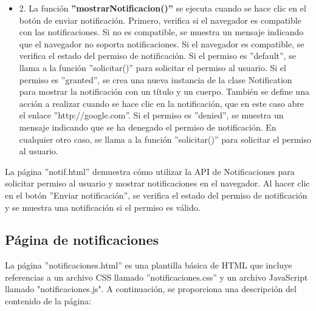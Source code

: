 \documentclass[12pt]{report}
\begin{document}
\begin{itemize}
\begin{itemize}
\begin{itemize}
            \item 2. La función\textbf{ ''mostrarNotificacion()''} se ejecuta cuando se hace clic en el botón de enviar notificación. Primero, verifica si el navegador es compatible con las notificaciones. Si no es compatible, se muestra un mensaje indicando que el navegador no soporta notificaciones. Si el navegador es compatible, se verifica el estado del permiso de notificación. Si el permiso es ''default'', se llama a la función ''solicitar()'' para solicitar el permiso al usuario. Si el permiso es ''granted'', se crea una nueva instancia de la clase Notification para mostrar la notificación con un título y un cuerpo. También se define una acción a realizar cuando se hace clic en la notificación, que en este caso abre el enlace ''http://google.com''. Si el permiso es ''denied'', se muestra un mensaje indicando que se ha denegado el permiso de notificación. En cualquier otro caso, se llama a la función ''solicitar()'' para solicitar el permiso al usuario.
        \end{itemize}
    \end{itemize}
\end{itemize}

La página ''notif.html'' demuestra cómo utilizar la API de Notificaciones para solicitar permiso al usuario y mostrar notificaciones en el navegador. Al hacer clic en el botón ''Enviar notificación'', se verifica el estado del permiso de notificación y se muestra una notificación si el permiso es válido.

\subsection{Página de notificaciones}
La página ''notificaciones.html'' es una plantilla básica de HTML que incluye referencias a un archivo CSS llamado ''notificaciones.css'' y un archivo JavaScript llamado "notificaciones.js". A continuación, se proporciona una descripción del contenido de la página:
\end{document}
